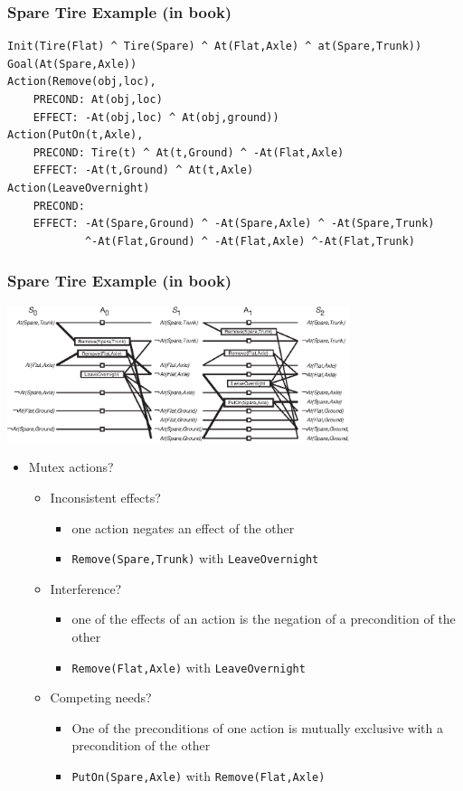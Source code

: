 \documentclass[compress, 9pt]{beamer}
\begin{document}
\begin{frame}[fragile]
\frametitle{Spare Tire Example (in book)}
\label{sec-3-2}


\begin{verbatim}
Init(Tire(Flat) ^ Tire(Spare) ^ At(Flat,Axle) ^ at(Spare,Trunk))
Goal(At(Spare,Axle))
Action(Remove(obj,loc),
    PRECOND: At(obj,loc)
    EFFECT: -At(obj,loc) ^ At(obj,ground))
Action(PutOn(t,Axle),
    PRECOND: Tire(t) ^ At(t,Ground) ^ -At(Flat,Axle)
    EFFECT: -At(t,Ground) ^ At(t,Axle)
Action(LeaveOvernight)
    PRECOND:
    EFFECT: -At(Spare,Ground) ^ -At(Spare,Axle) ^ -At(Spare,Trunk) 
            ^-At(Flat,Ground) ^ -At(Flat,Axle) ^-At(Flat,Trunk)
\end{verbatim}
\end{frame}
\begin{frame}
\frametitle{Spare Tire Example (in book)}
\label{sec-3-3}

\includegraphics[width=10cm]{../images/tire-graphplan2-no-mutex.eps}
\begin{itemize}
\item <1-> Mutex actions?
\begin{itemize}
\item <2-> Inconsistent effects?
\begin{itemize}
\item <3-> one action negates an effect of the other
\item <8-> \texttt{Remove(Spare,Trunk)} with \texttt{LeaveOvernight}
\end{itemize}
\item <4-> Interference?
\begin{itemize}
\item <5-> one of the effects of an action is the negation of a
      precondition of the other
\item <8-> \texttt{Remove(Flat,Axle)} with \texttt{LeaveOvernight}
\end{itemize}
\item <6-> Competing needs?
\begin{itemize}
\item <7-> One of the preconditions of one action is mutually
      exclusive with a precondition of the other
\item <8-> \texttt{PutOn(Spare,Axle)} with \texttt{Remove(Flat,Axle)}
\end{itemize}
\end{itemize}
\end{itemize}
\end{frame}
\end{document}
